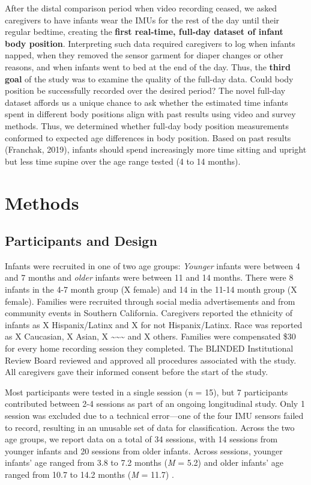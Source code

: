 \documentclass[
  man]{apa6}
\begin{document}
After the distal comparison period when video recording ceased, we asked caregivers to have infants wear the IMUs for the rest of the day until their regular bedtime, creating the \textbf{first real-time, full-day dataset of infant body position}. Interpreting such data required caregivers to log when infants napped, when they removed the sensor garment for diaper changes or other reasons, and when infants went to bed at the end of the day. Thus, the \textbf{third goal} of the study was to examine the quality of the full-day data. Could body position be successfully recorded over the desired period? The novel full-day dataset affords us a unique chance to ask whether the estimated time infants spent in different body positions align with past results using video and survey methods. Thus, we determined whether full-day body position measurements conformed to expected age differences in body position. Based on past results (Franchak, 2019), infants should spend increasingly more time sitting and upright but less time supine over the age range tested (4 to 14 months).

\hypertarget{methods}{%
\section{Methods}\label{methods}}

\hypertarget{participants-and-design}{%
\subsection{Participants and Design}\label{participants-and-design}}

Infants were recruited in one of two age groups: \emph{Younger} infants were between 4 and 7 months and \emph{older} infants were between 11 and 14 months. There were 8 infants in the 4-7 month group (X female) and 14 in the 11-14 month group (X female). Families were recruited through social media advertisements and from community events in Southern California. Caregivers reported the ethnicity of infants as X Hispanix/Latinx and X for not Hispanix/Latinx. Race was reported as X Caucasian, X Asian, X \textasciitilde\textasciitilde\textasciitilde{} and X others. Families were compensated \$30 for every home recording session they completed. The BLINDED Institutional Review Board reviewed and approved all procedures associated with the study. All caregivers gave their informed consent before the start of the study.

Most participants were tested in a single session (\emph{n} = 15), but 7 participants contributed between 2-4 sessions as part of an ongoing longitudinal study. Only 1 session was excluded due to a technical error---one of the four IMU sensors failed to record, resulting in an unusable set of data for classification. Across the two age groups, we report data on a total of 34 sessions, with 14 sessions from younger infants and 20 sessions from older infants. Across sessions, younger infants' age ranged from 3.8 to 7.2 months (\emph{M} = 5.2) and older infants' age ranged from 10.7 to 14.2 months (\emph{M} = 11.7) .
\end{document}

